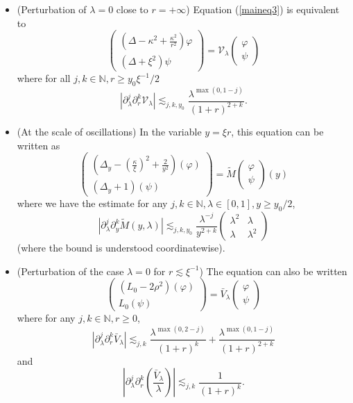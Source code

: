 \documentclass[10pt,a4paper]{amsart}
\begin{document}
\begin{lem}
  \label{eqsec9}
\begin{itemize}
\item[1)] (Perturbation of $\lambda = 0$ close to $r = + \infty$) Equation
  (\ref{maineq3}) is equivalent to
  \[ \left(\begin{array}{c}
       \left( \Delta - \kappa^2 + \frac{\kappa^2}{r^2} \right) \varphi\\
       (\Delta + \xi^2) \psi
     \end{array}\right) =\mathcal{V}_{\lambda} \left(\begin{array}{c}
       \varphi\\
       \psi
     \end{array}\right) \]
  where for all $j, k \in \mathbb{N}, r \geqslant y_0 \xi^{- 1}/2$
  \[ | \partial_{\lambda}^j \partial_r^k \mathcal{V}_{\lambda} | \lesssim_{j,
     k,y_0} \frac{\lambda^{\max (0, 1 - j)}}{(1 + r)^{2+k}} . \]
  
\item[2)] (At the scale of oscillations) In the variable $y = \xi r$, this equation
  can be written as
  \[ \left(\begin{array}{c}
       \left( \Delta_y - \left( \frac{\kappa}{\xi} \right)^2 + \frac{2}{y^2}
       \right) (\varphi)\\
       (\Delta_y + 1) (\psi)
     \end{array}\right) = \widetilde{M} \left(\begin{array}{c}
       \varphi\\
       \psi
     \end{array}\right) (y) \]
  where we have the estimate for any $j, k \in \mathbb{N}, \lambda \in [0, 1],
  y \geqslant y_0/2$,
  \[ | \partial_{\lambda}^j \partial_y^k \widetilde{M} (y, \lambda) | \lesssim_{j,
     k,y_0} \frac{\lambda^{- j}}{y^{2 + k}} \left(\begin{array}{cc}
       \lambda^2 & \lambda\\
       \lambda & \lambda^2
     \end{array}\right) \]
(where the bound is understood coordinatewise).
  
\item[3)] (Perturbation of the case $\lambda = 0$ for $r \lesssim \xi^{-1}$) The equation can also be written 
  \[ \left(\begin{array}{c}
       (L_0 - 2 \rho^2) (\varphi)\\
       L_0 (\psi)
     \end{array}\right) = \bar{V}_{\lambda} \left(\begin{array}{c}
       \varphi\\
       \psi
     \end{array}\right) \]
  where for any $j, k \in \mathbb{N}, r \geqslant 0$,
  \[ | \partial_{\lambda}^j \partial_r^k \bar{V}_{\lambda} | \lesssim_{j, k}
     \frac{\lambda^{\max (0, 2 - j)}}{(1 + r)^k} + \frac{\lambda^{\max (0, 1 -
     j)}}{(1 + r)^{2 + k}} \]
  and
  \[ \left| \partial_{\lambda}^j \partial_r^k \left(
     \frac{\bar{V}_{\lambda}}{\lambda} \right) \right| \lesssim_{j, k}
     \frac{1}{(1 + r)^k} . \]
  

\end{itemize}
\end{lem}
\end{document}
